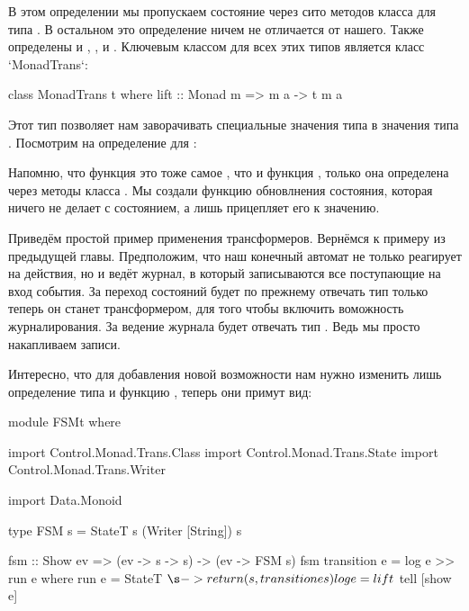 
В этом определении мы пропускаем состояние через сито
методов класса  для типа . В остальном это определение
ничем не отличается от нашего. Также определены и ,
,  и . Ключевым классом для всех этих
типов является класс `MonadTrans`:

\begin{code}
class MonadTrans t where
    lift :: Monad m => m a -> t m a 
\end{code}

Этот тип позволяет нам заворачивать специальные значения
типа  в значения типа . Посмотрим на определение для 
: 


Напомню, что функция  это тоже самое , что и функция ,
только она определена через методы класса .
Мы создали функцию обновлнения состояния, которая ничего
не делает с состоянием, а лишь прицепляет его к значению.

Приведём простой пример применения трансформеров. 
Вернёмся к примеру  из предыдущей главы. 
Предположим, что наш конечный автомат не только реагирует
на действия, но и ведёт журнал, в который записываются 
все поступающие на вход события. За переход состояний будет
по прежнему отвечать тип  только теперь он станет
трансформером, для того чтобы включить воможность
журналирования. За ведение журнала будет отвечать
тип . Ведь мы просто накапливаем записи.

Интересно, что для добавления новой возможности нам
нужно изменить лишь определение типа  и функцию
, теперь они примут вид:

\begin{code}
module FSMt where

import Control.Monad.Trans.Class
import Control.Monad.Trans.State
import Control.Monad.Trans.Writer

import Data.Monoid

type FSM s = StateT s (Writer [String]) s

fsm :: Show ev => (ev -> s -> s) -> (ev -> FSM s)
fsm transition e = log e >> run e
    where run e = StateT $ \s -> return (s, transition e s)  
          log e = lift $ tell [show e] 
\end{code}

